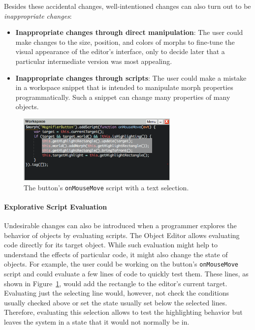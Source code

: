 Besides these accidental changes, well-intentioned changes can also turn out to be \emph{inappropriate changes}:

\begin{itemize}
    \item \textbf{Inappropriate changes through direct manipulation}: The user could make changes to the size, position, and colors of morphs to fine-tune the visual appearance of the editor's interface, only to decide later that a particular intermediate version was most appealing.
    \item \textbf{Inappropriate changes through scripts}: The user could make a mistake in a workspace snippet that is intended to manipulate morph properties programmatically. Such a snippet can change many properties of many objects.
\end{itemize}

\begin{figure}[h]
    \centering
    \includegraphics[width=0.7\textwidth]{figures/3_motivation/4_workspaceDoIt.png}
    \caption{The button's \lstinline{onMouseMove} script with a text selection.}
    \label{fig:onMouseOverScript}
\end{figure}

\paragraph{Explorative Script Evaluation}
Undesirable changes can also be introduced when a programmer explores the behavior of objects by evaluating scripts.
The Object Editor allows evaluating code directly for its target object.
While such evaluation might help to understand the effects of particular code, it might also change the state of objects.
For example, the user could be working on the button's \lstinline{onMouseMove} script and could evaluate a few lines of code to quickly test them.
These lines, as shown in Figure~\ref{fig:onMouseOverScript}, would add the rectangle to the editor's current target.
Evaluating just the selecting line would, however, not check the conditions usually checked above or set the state usually set below the selected lines.
Therefore, evaluating this selection allows to test the highlighting behavior but leaves the system in a state that it would not normally be in.

